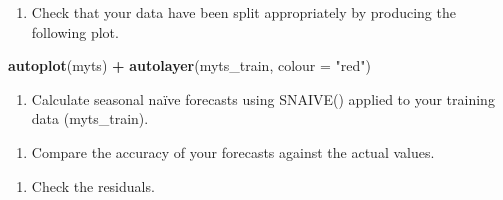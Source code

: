 \documentclass[]{book}
\newenvironment{Shaded}{\begin{snugshade}}{\end{snugshade}}
\newcommand{\KeywordTok}[1]{\textcolor[rgb]{0.13,0.29,0.53}{\textbf{#1}}}
\newcommand{\DataTypeTok}[1]{\textcolor[rgb]{0.13,0.29,0.53}{#1}}
\newcommand{\StringTok}[1]{\textcolor[rgb]{0.31,0.60,0.02}{#1}}
\newcommand{\OperatorTok}[1]{\textcolor[rgb]{0.81,0.36,0.00}{\textbf{#1}}}
\newcommand{\NormalTok}[1]{#1}
\providecommand{\tightlist}{%
  \setlength{\itemsep}{0pt}\setlength{\parskip}{0pt}}
\begin{document}
\begin{enumerate}
\def\labelenumi{\alph{enumi}.}
\setcounter{enumi}{1}
\tightlist
\item
  Check that your data have been split appropriately by producing the
  following plot.
\end{enumerate}

\begin{Shaded}
\begin{Highlighting}[]
\KeywordTok{autoplot}\NormalTok{(myts) }\OperatorTok{+}
\StringTok{  }\KeywordTok{autolayer}\NormalTok{(myts_train, }\DataTypeTok{colour =} \StringTok{"red"}\NormalTok{)}
\end{Highlighting}
\end{Shaded}

\begin{enumerate}
\def\labelenumi{\alph{enumi}.}
\setcounter{enumi}{2}
\tightlist
\item
  Calculate seasonal naïve forecasts using SNAIVE() applied to your
  training data (myts\_train).
\end{enumerate}

\begin{Shaded}
\end{Shaded}

\begin{enumerate}
\def\labelenumi{\alph{enumi}.}
\setcounter{enumi}{3}
\tightlist
\item
  Compare the accuracy of your forecasts against the actual values.
\end{enumerate}

\begin{Shaded}
\end{Shaded}

\begin{enumerate}
\def\labelenumi{\alph{enumi}.}
\setcounter{enumi}{4}
\tightlist
\item
  Check the residuals.
\end{enumerate}
\end{document}
